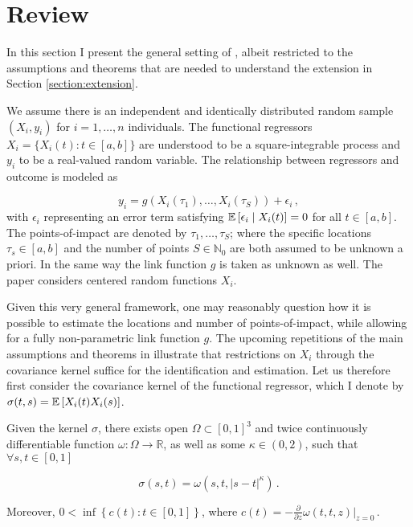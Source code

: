 \section{Review}
\label{section:review}

In this section I present the general setting of \cite{Kneip2020}, albeit restricted to
the assumptions and theorems that are needed to understand the extension in Section
\ref{section:extension}.

We assume there is an independent and identically distributed random sample $(X_i, y_i)$
for $i=1,\dots,n$ individuals. The functional regressors $X_i = \{ X_i(t) : t \in [a, b]
\}$ are understood to be a square-integrable process and $y_i$ to be a real-valued
random variable. The relationship between regressors and outcome is modeled as

\[
    y_i = g \left( X_i(\tau_1), \dots, X_i(\tau_S) \right) + \epsilon_i \,,
\]
with $\epsilon_i$ representing an error term satisfying $\mathbb{E}\left[\epsilon_i \mid
X_i(t)\right] = 0$ for all $t \in [a, b]$. The points-of-impact are denoted by $\tau_1, \dots,
\tau_S$; where the specific locations $\tau_s \in [a, b]$ and the number of points $S
\in \mathbb{N}_0$ are both assumed to be unknown a priori. In the same way the link
function $g$ is taken as unknown as well. The paper considers centered random functions
$X_i$.

Given this very general framework, one may reasonably question how it is possible to
estimate the locations and number of points-of-impact, while allowing for a fully
non-parametric link function $g$. The upcoming repetitions of the main assumptions and
theorems in \cite{Kneip2020} illustrate that restrictions on $X_i$ through the
covariance kernel suffice for the identification and estimation. Let us therefore first
consider the covariance kernel of the functional regressor, which I denote by $\sigma(t,
s) = \mathbb{E}\left[X_i(t) X_i(s)\right]$.


\begin{assumption}
    Given the kernel $\sigma$, there exists open $\Omega \subset [0, 1]^3$ and twice
    continuously differentiable function $\omega : \Omega \to \mathbb{R}$, as well as
    some $\kappa \in (0, 2)$, such that $\forall s, t \in [0, 1]$

    \[
        \sigma(s, t) = \omega(s, t, |s-t|^{\kappa}) \,.
    \]

    Moreover, $0 < \inf \left\{ c(t) : t \in [0, 1] \right\}$, where $c(t) =
    -\frac{\partial}{\partial z} \omega(t, t, z)|_{z = 0} \,.$
\label{assumption:1}
\end{assumption}

